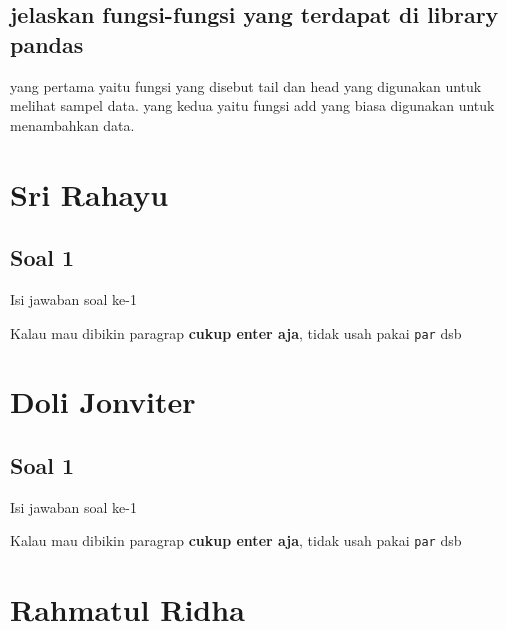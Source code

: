 \subsection{jelaskan fungsi-fungsi yang terdapat di library pandas}
yang pertama yaitu fungsi yang disebut tail dan head yang digunakan untuk melihat sampel data.
        yang kedua yaitu fungsi add yang biasa digunakan untuk menambahkan data. 

\section{Sri Rahayu}
\subsection{Soal 1}
Isi jawaban soal ke-1

Kalau mau dibikin paragrap \textbf{cukup enter aja}, tidak usah pakai \verb|par| dsb



\section{Doli Jonviter}
\subsection{Soal 1}
Isi jawaban soal ke-1

Kalau mau dibikin paragrap \textbf{cukup enter aja}, tidak usah pakai \verb|par| dsb



\section{Rahmatul Ridha}
